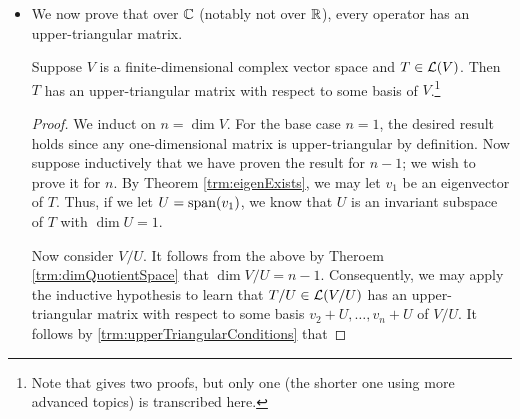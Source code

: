 \documentclass[../main.tex]{subfiles}
\begin{document}
\begin{itemize}
\begin{theorem}
\begin{proof}
            Suppose first that the matrix of $T$ with respect to $v_1,\dots,v_n$ is upper triangular. Let $j\in\{1,\dots,n\}$ be arbitrary. By the definition of $\mat{T}$, $Tv_j=A_{1,j}v_1+\cdots+A_{n,j}v_n$. Additionally, since $\mat{T}$ is upper triangular, we know that $A_{j+1,j}=\cdots=A_{n,j}=0$. Therefore, $Tv_j=A_{1,j}v_1+\cdots+A_{j,j}v_j\in\spn(v_1,\dots,v_j)$, as desired. The proof is symmetric in the other direction.\par
            Now suppose that $Tv_j\in\spn(v_1,\dots,v_j)$ for each $j=1,\dots,n$. Fix $j\in\{1,\dots,n\}$. Let $v\in\spn(v_1,\dots,v_j)$. It follows since $Tv_i\in\spn(v_1,\dots,v_i)\subset\spn(v_1,\dots,v_j)$ for all $i=1,\dots,j$ by hypothesis that
            \begin{align*}
                Tv &= T(a_1v_1+\cdots+a_jv_j)\\
                &= a_1Tv_1+\cdots+a_jTv_j\\
                &\in \spn(v_1,\dots,v_j)
            \end{align*}
            as desired. On the other hand, suppose $\spn(v_1,\dots,v_j)$ is invariant under $T$ for each $j=1,\dots,n$. Fix $j\in\{1,\dots,n\}$. Then by the definition of invariance, $v_j\in\spn(v_1,\dots,v_j)$ implies that $Tv_j\in\spn(v_1,\dots,v_j)$, as desired.
        \end{proof}
    \end{theorem}
    \item We now prove that over $\mathbb{C}$ (notably not over $\mathbb{R}$), every operator has an upper-triangular matrix.
    \begin{theorem}\label{trm:upperTriangularExists}
        Suppose $V$ is a finite-dimensional complex vector space and $T\in\mathcal{L}(V)$. Then $T$ has an upper-triangular matrix with respect to some basis of $V$.\footnote{Note that \textcite{bib:Axler} gives two proofs, but only one (the shorter one using more advanced topics) is transcribed here.}
        \begin{proof}
            We induct on $n=\dim V$. For the base case $n=1$, the desired result holds since any one-dimensional matrix is upper-triangular by definition. Now suppose inductively that we have proven the result for $n-1$; we wish to prove it for $n$. By Theorem \ref{trm:eigenExists}, we may let $v_1$ be an eigenvector of $T$. Thus, if we let $U=\operatorname{span}(v_1)$, we know that $U$ is an invariant subspace of $T$ with $\dim U=1$.\par
            Now consider $V/U$. It follows from the above by Theroem \ref{trm:dimQuotientSpace} that $\dim V/U=n-1$. Consequently, we may apply the inductive hypothesis to learn that $T/U\in\mathcal{L}(V/U)$ has an upper-triangular matrix with respect to some basis $v_2+U,\dots,v_n+U$ of $V/U$. It follows by \ref{trm:upperTriangularConditions} that

\end{proof}
\end{theorem}
\end{itemize}
\end{document}
